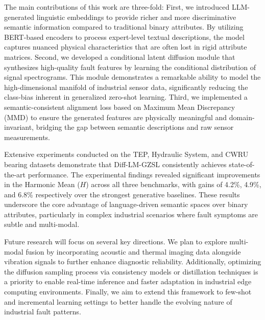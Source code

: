 \documentclass[journal]{IEEEtran}
\begin{document}
The main contributions of this work are three-fold: 
First, we introduced LLM-generated linguistic embeddings to provide richer and more discriminative semantic information compared to traditional binary attributes. By utilizing BERT-based encoders to process expert-level textual descriptions, the model captures nuanced physical characteristics that are often lost in rigid attribute matrices. 
Second, we developed a conditional latent diffusion module that synthesizes high-quality fault features by learning the conditional distribution of signal spectrograms. This module demonstrates a remarkable ability to model the high-dimensional manifold of industrial sensor data, significantly reducing the class-bias inherent in generalized zero-shot learning. 
Third, we implemented a semantic-consistent alignment loss based on Maximum Mean Discrepancy (MMD) to ensure the generated features are physically meaningful and domain-invariant, bridging the gap between semantic descriptions and raw sensor measurements.

Extensive experiments conducted on the TEP, Hydraulic System, and CWRU bearing datasets demonstrate that Diff-LM-GZSL consistently achieves state-of-the-art performance. The experimental findings revealed significant improvements in the Harmonic Mean ($H$) across all three benchmarks, with gains of 4.2\%, 4.9\%, and 6.8\% respectively over the strongest generative baselines. These results underscore the core advantage of language-driven semantic spaces over binary attributes, particularly in complex industrial scenarios where fault symptoms are subtle and multi-modal.

Future research will focus on several key directions. We plan to explore multi-modal fusion by incorporating acoustic and thermal imaging data alongside vibration signals to further enhance diagnostic reliability. Additionally, optimizing the diffusion sampling process via consistency models or distillation techniques is a priority to enable real-time inference and faster adaptation in industrial edge computing environments. Finally, we aim to extend this framework to few-shot and incremental learning settings to better handle the evolving nature of industrial fault patterns.



\end{document}
